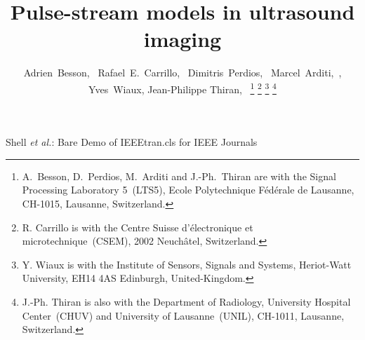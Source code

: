 \documentclass[journal]{IEEEtran}
\theoremstyle{definition}
\begin{document}
%
\title{Pulse-stream models in ultrasound imaging}
%
%
%

\author{Adrien~Besson,~
        Rafael~E.~Carrillo,~
        Dimitris~Perdios,~
        Marcel~Arditi,~,
        Yves~Wiaux,
        Jean-Philippe Thiran,~%
\thanks{A.~Besson, D.~Perdios, M.~Arditi and J.-Ph.~Thiran are with the Signal Processing Laboratory 5~(LTS5), Ecole Polytechnique F\'{e}d\'{e}rale de Lausanne, CH-1015, Lausanne, Switzerland.}%
\thanks{R. Carrillo is with the Centre Suisse d'\'{e}lectronique et microtechnique~(CSEM), 2002 Neuch\^{a}tel, Switzerland.}%
\thanks{Y. Wiaux is with the Institute of Sensors, Signals and Systems, Heriot-Watt University, EH14 4AS Edinburgh, United-Kingdom.}%
\thanks{J.-Ph. Thiran is also with the Department of Radiology, University Hospital Center~(CHUV) and University of Lausanne~(UNIL), CH-1011, Lausanne, Switzerland.}}%

%
{Shell \MakeLowercase{\textit{et al.}}: Bare Demo of IEEEtran.cls for IEEE Journals}
% 




\end{document}
